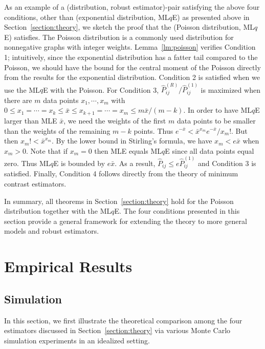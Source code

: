 \documentclass[a4paper]{article}
\renewcommand{\hat}{\widehat}
\begin{document}
As an example of a (distribution, robust estimator)-pair satisfying the above four conditions, other than (exponential distribution, ML$q$E) as presented above in Section~\ref{section:theory}, we sketch the proof that the (Poisson distribution, ML$q$E) satisfies. The Poisson distribution is a commonly used distribution for nonnegative graphs with integer weights. Lemma~\ref{lm:poisson} verifies Condition 1; intuitively, since the exponential distribution has a fatter tail compared to the Poisson, we should have the bound for the central moment of the Poisson directly from the results for the exponential distribution. Condition 2 is satisfied when we use the ML$q$E with the Poisson. For Condition 3, $\hat{P}^{(R)}_{ij}/\hat{P}^{(1)}_{ij}$ is maximized when there are $m$ data points $x_1, \cdots, x_m$ with $0 \le x_1 = \cdots = x_k \le \bar{x} \le x_{k+1} = \cdots = x_m \le m \bar{x}/(m - k)$. In order to have ML$q$E larger than MLE $\bar{x}$, we need the weights of the first $m$ data points to be smaller than the weights of the remaining $m - k$ points. Thus $e^{-\bar{x}} < \bar{x}^{x_m} e^{-\bar{x}} / x_m!$. But then $x_m! < \bar{x}^{x_m}$. By the lower bound in Stirling's formula, we have $x_m < e \bar{x}$ when $x_m > 0$. Note that if $x_m = 0$ then MLE equals ML$q$E since all data points equal zero. Thus ML$q$E is bounded by $e \bar{x}$. As a result, $\hat{P}_{ij} \le e \hat{P}_{ij}^{(1)}$ and Condition 3 is satisfied. Finally, Condition 4 follows directly from the theory of minimum contrast estimators.

In summary, all theorems in Section~\ref{section:theory} hold for the Poisson distribution together with the ML$q$E. The four conditions presented in this section provide a general framework for extending the theory to more general models and robust estimators.


\section{Empirical Results}
\label{section:results}

\subsection{Simulation}
\label{section:sim}

In this section, we first illustrate the theoretical comparison among the four estimators discussed in Section~\ref{section:theory} via various Monte Carlo simulation experiments in an idealized setting.
\end{document}
